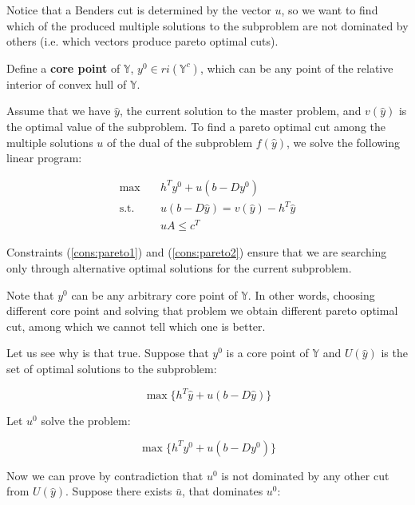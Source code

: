                 Notice that a Benders cut is determined by the vector $u$, so we want to find which of the produced multiple solutions to the subproblem are not dominated by others (i.e. which vectors produce pareto optimal cuts).

                Define a \textbf{core point} of $\mathbb{Y}$, $y^0 \in ri(\mathbb{Y}^c)$, which can be any point of the relative interior of convex hull of $\mathbb{Y}$.

                Assume that we have $\hat{y}$, the current solution to the master problem, and $v(\hat{y})$ is the optimal value of the subproblem. To find a pareto optimal cut among the multiple solutions $u$ of the dual of the subproblem $f(\hat{y})$, we solve the following linear program:

                \begin{align}
                    \max \quad & h^Ty^0 + u(b - Dy^0)\\
                    \text{s.t.} \quad & u(b - D\hat{y}) = v(\hat{y}) - h^T\hat{y} \label{cons:pareto1}\\
                    &uA \le c^T \label{cons:pareto2}
                \end{align}

                Constraints (\ref{cons:pareto1}) and (\ref{cons:pareto2}) ensure that we are searching only through alternative optimal solutions for the current subproblem. 

                Note that $y^0$ can be any arbitrary core point of $\mathbb{Y}$. In other words, choosing different core point and solving that problem we obtain different pareto optimal cut, among which we cannot tell which one is better.

                Let us see why is that true. Suppose that $y^0$ is a core point of $\mathbb{Y}$ and $U(\hat{y})$ is the set of optimal solutions to the subproblem:

                \begin{equation}
                    \max\{h^T\hat{y} + u(b - D\hat{y})\} \label{cons:sub}
                \end{equation}

                Let $u^0$ solve the problem:

                \begin{equation}
                    \max\{h^Ty^0 + u(b - Dy^0)\} \label{cons:sub0}
                \end{equation}  

                Now we can prove by contradiction that $u^0$ is not dominated by any other cut from $U(\hat{y})$. Suppose there exists $\bar{u}$, that dominates $u^0$:

